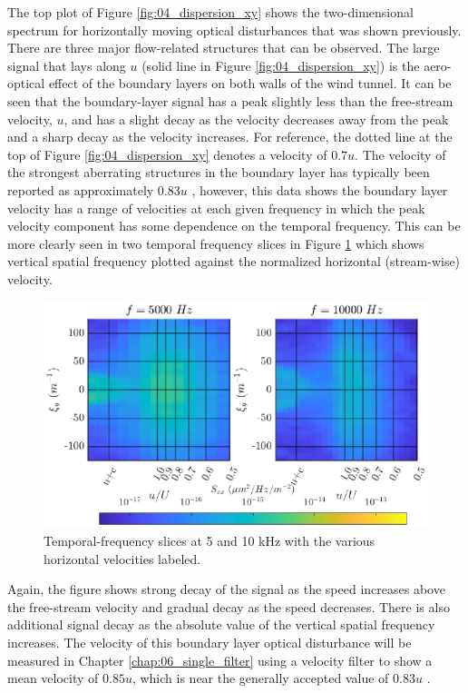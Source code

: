 The top plot of Figure \ref{fig:04_dispersion_xy} shows the two-dimensional spectrum for horizontally moving optical disturbances that was shown previously.
There are three major flow-related structures that can be observed.
The large signal that lays along $u$ (solid line in Figure \ref{fig:04_dispersion_xy}) is the aero-optical effect of the boundary layers on both walls of the wind tunnel.
It can be seen that the boundary-layer signal has a peak slightly less than the free-stream velocity, $u$, and has a slight decay as the velocity decreases away from the peak and a sharp decay as the velocity increases.
For reference, the dotted line at the top of Figure \ref{fig:04_dispersion_xy} denotes a velocity of $0.7u$.
The velocity of the strongest aberrating structures in the boundary layer has typically been reported as approximately 0.83$u$ \cite{Gordeyev-2014-jcJndkHM}, however, this data shows the boundary layer velocity has a range of velocities at each given frequency in which the peak velocity component has some dependence on the temporal frequency.
This can be more clearly seen in two temporal frequency slices in Figure \ref{fig:04_dispersion_slices_velocity} which shows vertical spatial frequency plotted against the normalized horizontal (stream-wise) velocity.
\begin{figure}
  \centering
  \includegraphics{../matlab/04_dispersion_analysis/dispersion_slices_velocity.eps}
  \caption{Temporal-frequency slices at 5 and 10 kHz with the various horizontal velocities labeled.}
  \label{fig:04_dispersion_slices_velocity}
\end{figure}
Again, the figure shows strong decay of the signal as the speed increases above the free-stream velocity and gradual decay as the speed decreases.
There is also additional signal decay as the absolute value of the vertical spatial frequency increases.
The velocity of this boundary layer optical disturbance will be measured in Chapter \ref{chap:06_single_filter} using a velocity filter to show a mean velocity of $0.85u$, which is near the generally accepted value of $0.83u$ \cite{Gordeyev-2014-jcJndkHM}.

